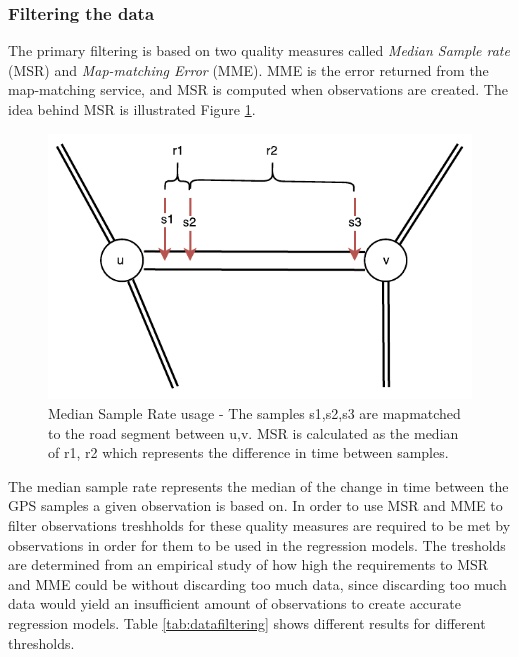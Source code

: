 \subsubsection{Filtering the data}
The primary filtering is based on two quality measures called \emph{Median Sample rate} (MSR) and \emph{Map-matching Error} (MME). MME is the error returned from the map-matching service, and MSR is computed when observations are created. The idea behind MSR is illustrated Figure \ref{fig:MSR}. 
\begin{figure}[H]
\centering
\includegraphics[width=\textwidth]{figures/MSR.pdf}
\caption{Median Sample Rate usage - The samples s1,s2,s3 are mapmatched to the road segment between u,v. MSR is calculated as the median of r1, r2 which represents the difference in time between samples.}
\label{fig:MSR}
\end{figure}
The median sample rate represents the median of the change in time between the GPS samples a given observation is based on. 
In order to use MSR and MME to filter observations treshholds for these quality measures are required to be met by observations in order for them to be used in the regression models. The tresholds are determined from an empirical study of how high the requirements to MSR and MME could be without discarding too much data, since discarding too much data would yield an insufficient amount of observations to create accurate regression models. Table \ref{tab:datafiltering} shows different results for different thresholds.

